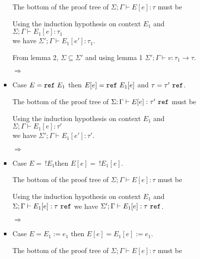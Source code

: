 \begin{enumerate}[(a)]
\begin{enumerate}[i.]
\begin{itemize}
\begin{itemize}
  The bottom of the proof tree of $\Sigma;\Gamma \vdash E[e] : \tau$ must be 

  Using the induction hypothesis on context $E_1$ and $\Sigma;\Gamma \vdash E_1[e] : \tau_1$ \\
  we have $\Sigma';\Gamma \vdash E_1[e'] : \tau_1$.

  From lemma 2, $\Sigma \subseteq \Sigma'$ and using lemma 1 $\Sigma' ; \Gamma \vdash v : \tau_1 \rightarrow \tau$.

  $\Rightarrow$
  \item Case $E = \texttt{ref}~E_1$ then $E[e] = \texttt{ref}~E_1[e]$ and $\tau = \tau'~\texttt{ref}$. 

  The bottom of the proof tree of $\Sigma;\Gamma \vdash E[e] : \tau'~\texttt{ref}$ must be 

  Using the induction hypothesis on context $E_1$ and $\Sigma;\Gamma \vdash E_1[e] : \tau'$ \\
  we have $\Sigma';\Gamma \vdash E_1[e'] : \tau'$.

  $\Rightarrow$
  \item Case $E =~!E_1$then $E[e] = ~!E_1[e]$.

  The bottom of the proof tree of $\Sigma;\Gamma \vdash E[e] : \tau$ must be 

  Using the induction hypothesis on context $E_1$ and $\Sigma;\Gamma \vdash E_1[e] : \tau~\texttt{ref}$ we have $\Sigma';\Gamma \vdash E_1[e] : \tau~\texttt{ref}$.

  $\Rightarrow$
  \item Case $E = E_1 := e_1$ then $E[e] = E_1[e] := e_1$. 

  The bottom of the proof tree of $\Sigma;\Gamma \vdash E[e] : \tau$ must be 


\end{itemize}
\end{itemize}
\end{enumerate}
\end{enumerate}
